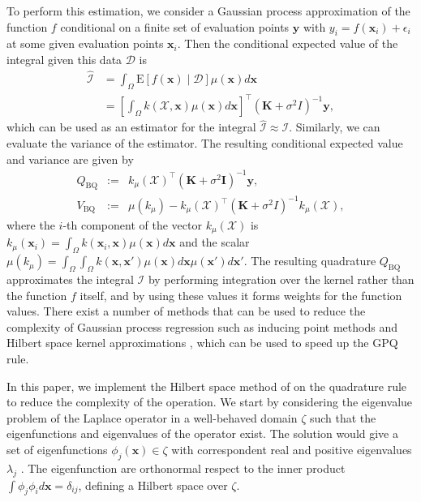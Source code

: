 \documentclass[10pt]{article}
\begin{document}
	To perform this estimation, we consider a Gaussian process approximation of the function $f$ conditional on a finite set of evaluation points $\mathbf{y}$ with $y_i = f(\mathbf{x}_i) + \epsilon_i$ at some given evaluation points $\mathbf{x}_i$. Then the conditional expected value of the integral given this data $\mathcal{D}$ is
	\begin{equation}
		\begin{aligned}
			\hat{\mathcal{I}}  &= \int_\Omega \mathrm{E}[{f}(\mathbf{x})\mid \mathcal{D}]\mu(\mathbf{x}) d\mathbf{x}\\
			&= \left[\int_\Omega k(\mathcal{X},\mathbf{x})\mu(\mathbf{x})d\mathbf{x}\right]^{\top}(\mathbf{K} + \sigma^2 I)^{-1} \mathbf{y},
		\end{aligned}
	\end{equation}
	which can be used as an estimator for the integral $\hat{\mathcal{I}} \approx \mathcal{I}$. Similarly, we can evaluate the variance of the estimator. The resulting conditional expected value and variance are given by \citep{Hennig2022ProbabilisticNumerics, Karvonen2017ClassicalquadraturefromGP}
	\begin{eqnarray}
		Q_{\mathrm{BQ}} &:=& k_\mu(\mathcal{X})^{\top}\left(\mathbf{K}+\sigma^2 \mathbf{I}\right)^{-1} \mathbf{y},\label{eq: Classic GPQ mean} \\
		V_{\mathrm{BQ}} &:=&\mu\left(k_\mu\right)-k_\mu(\mathcal{X})^{\top} (\mathbf{K} + \sigma^2 I)^{-1} k_\mu(\mathcal{X}), \label{eq: Classic GPQ var}
	\end{eqnarray}
	where the $i$-th component of the vector  $k_\mu(\mathcal{X})$ is $k_\mu(\mathbf{x}_i) = \int_\Omega k(\mathbf{x}_i,\mathbf{x})\mu(\mathbf{x})d\mathbf{x}$ and the scalar $\mu\left(k_\mu\right) = \int_\Omega\int_\Omega k(\mathbf{x},\mathbf{x}')\mu(\mathbf{x}) d\mathbf{x} \mu(\mathbf{x}') d\mathbf{x}'$. The resulting quadrature $Q_{\mathrm{BQ}}$ approximates the integral $\mathcal{I}$ by performing integration over the kernel rather than the function $f$ itself, and by using these values it forms weights for the function values. There exist a number of methods that can be used to reduce the complexity of Gaussian process regression such as inducing point methods \citep{Quinonero2005UnifyingGPR} and Hilbert space kernel approximations \citep{Solin2020HilbertSpaceGPR}, which can be used to speed up the GPQ rule.
	
	In this paper, we implement the Hilbert space method of \citet{Solin2020HilbertSpaceGPR} on the quadrature rule to reduce the complexity of the operation. We start by considering the eigenvalue problem of the Laplace operator in a well-behaved domain $\zeta$ such that the eigenfunctions and eigenvalues of the operator exist. The solution would give a set of eigenfunctions $\phi_j(\mathbf{x}) \in \zeta$ with correspondent real and positive eigenvalues $\lambda_j$ \citep{Arfken2013MathPhysics}. The eigenfunction are orthonormal respect to the inner product $\int \phi_j \phi_i d\mathbf{x} = \delta_{ij}$, defining a Hilbert space over $\zeta$.
	
\end{document}
